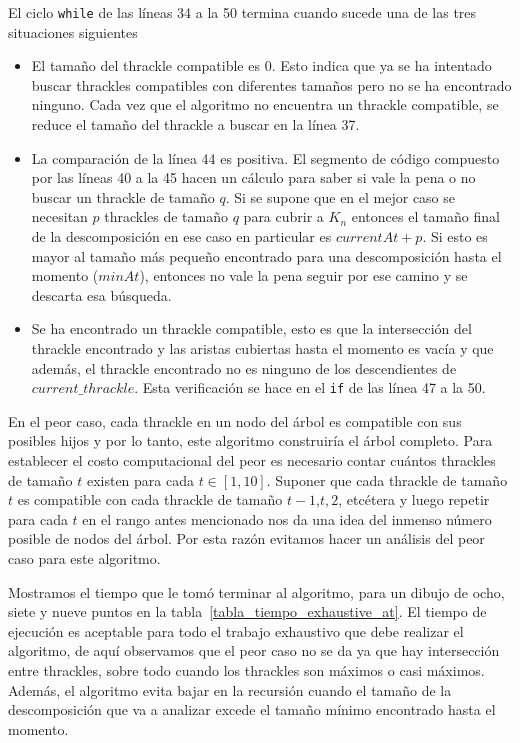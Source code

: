   El ciclo \texttt{while} de las líneas 34 a la 50 termina cuando sucede una de las tres situaciones siguientes
  \begin{itemize}
    \item El tamaño del thrackle compatible es 0. Esto indica que ya se ha intentado buscar thrackles compatibles con diferentes tamaños pero no se ha encontrado ninguno. Cada vez que el algoritmo no encuentra un thrackle compatible, se reduce el tamaño del thrackle a buscar en la línea 37.
    \item La comparación de la línea 44 es positiva. El segmento de código compuesto por las líneas 40 a la 45 hacen un cálculo para saber si vale la pena o no buscar un thrackle de tamaño $q$. Si se supone que en el mejor caso se necesitan $p$ thrackles de tamaño $q$ para cubrir a $K_n$ entonces el tamaño final de la descomposición en ese caso en particular es $currentAt + p$. Si esto es mayor al tamaño más pequeño encontrado para una descomposición hasta el momento ($minAt$), entonces no vale la pena seguir por ese camino y se descarta esa búsqueda.
    \item Se ha encontrado un thrackle compatible, esto es que la intersección del thrackle encontrado y las aristas cubiertas hasta el momento es vacía y que además, el thrackle encontrado no es ninguno de los descendientes de $current\_thrackle$. Esta verificación se hace en el \texttt{if} de las línea 47 a la 50.
  \end{itemize}

  En el peor caso, cada thrackle en un nodo del árbol es compatible con sus posibles hijos y por lo
  tanto, este algoritmo construiría el árbol completo. Para establecer el costo computacional del peor
  es necesario contar cuántos thrackles de tamaño $t$ existen para cada $t \in [1,10]$. Suponer que
  cada thrackle de tamaño $t$ es compatible con cada thrackle de tamaño $t-1$,$t,2$, etcétera y luego
  repetir para cada $t$ en el rango antes mencionado nos da una idea del inmenso número posible de
  nodos del árbol. Por esta razón evitamos hacer un análisis del peor caso para este algoritmo.

  Mostramos el tiempo que le tomó terminar al algoritmo, para un dibujo de ocho, siete y nueve puntos
  en la tabla~\ref{tabla_tiempo_exhaustive_at}. El tiempo de ejecución es aceptable para todo el
  trabajo exhaustivo que debe realizar el algoritmo, de aquí observamos que el peor caso no se da ya
  que hay intersección entre thrackles, sobre todo cuando los thrackles son máximos o casi máximos.
  Además, el algoritmo evita bajar en la recursión cuando el tamaño de la descomposición que va a
  analizar excede el tamaño mínimo encontrado hasta el momento.


